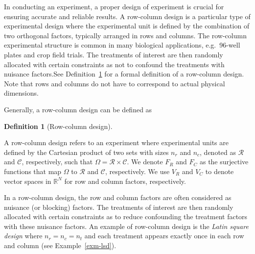 \documentclass[
  a4paper,
  oneside,
  openany,
  12pt,
  onecolumn]{book}
\theoremstyle{definition}
\newtheorem{definition}{Definition}[chapter]
\theoremstyle{definition}
\theoremstyle{plain}
\theoremstyle{remark}
\begin{document}
In conducting an experiment, a proper design of experiment is crucial
for ensuring accurate and reliable results. A row-column design is a
particular type of experimental design where the experimental unit is
defined by the combination of two orthogonal factors, typically arranged
in rows and columns. The row-column experimental structure is common in
many biological applications, e.g.~96-well plates and crop field trials.
The treatments of interest are then randomly allocated with certain
constraints as not to confound the treatments with nuisance factors.See
Definition~\ref{def-rowcol} for a formal definition of a row-column
design. Note that rows and columns do not have to correspond to actual
physical dimensions.

Generally, a row-column design can be defined as

\begin{definition}[Row-column
design]\protect\hypertarget{def-rowcol}{}\label{def-rowcol}

A row-column design refers to an experiment where experimental units are
defined by the Cartesian product of two sets with sizes \(n_r\) and
\(n_c\), denoted as \(\mathcal{R}\) and \(\mathcal{C}\), respectively,
such that \(\Omega = \mathcal{R} \times \mathcal{C}\). We denote \(F_R\)
and \(F_C\) as the surjective functions that map \(\Omega\) to
\(\mathcal{R}\) and \(\mathcal{C}\), respectively. We use \(V_R\) and
\(V_C\) to denote vector spaces in \(\mathbb{R}^N\) for row and column
factors, respectively.

\end{definition}

In a row-column design, the row and column factors are often considered
as nuisance (or blocking) factors. The treatments of interest are then
randomly allocated with certain constraints as to reduce confounding the
treatment factors with these nuisance factors. An example of row-column
design is the \emph{Latin square design} where \(n_r = n_c = n_t\) and
each treatment appears exactly once in each row and column (see
Example~\ref{exm-lsd}).
\end{document}
